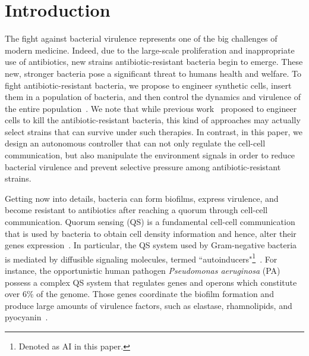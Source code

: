 \documentclass[runningheads]{llncs}
\begin{document}
\section{Introduction}
The fight against bacterial virulence represents one of the big challenges of modern medicine. Indeed, due to the large-scale proliferation and inappropriate use of antibiotics, new strains antibiotic-resistant bacteria begin to emerge. These new, stronger bacteria pose a significant threat to humans health and welfare. To fight antibiotic-resistant bacteria, we propose to engineer synthetic cells, insert them in a population of bacteria, and then control the dynamics and virulence of the entire population~\cite{Fischbach2013}. We note that while previous work~\cite{Cheng2014}\cite{Yosef2015} proposed to engineer cells to kill the antibiotic-resistant bacteria, this kind of approaches may actually select strains that can survive under such therapies. In contrast, in this paper, we design an autonomous controller that can not only regulate the cell-cell communication, but also manipulate the environment signals in order to reduce bacterial virulence and prevent selective pressure among antibiotic-resistant strains.  

Getting now into details, bacteria can form biofilms, express virulence, and become resistant to antibiotics after reaching a quorum through cell-cell communication. Quorum sensing (QS) is a fundamental cell-cell communication that is used by bacteria to obtain cell density information and hence, alter their genes expression~\cite{Bassler2006}. In particular, the QS system used by Gram-negative bacteria is mediated by diffusible signaling molecules, termed ``autoinducers"\footnote{Denoted as AI in this paper.}~\cite{Bassler2006}. For instance, the opportunistic human pathogen \textit{Pseudomonas aeruginosa} (PA) possess a complex QS system that regulates genes and operons which constitute over 6\% of the genome. Those genes coordinate the biofilm formation and produce large amounts of virulence factors, such as elastase, rhamnolipids, and pyocyanin~\cite{Haussler2008}.  
\end{document}
